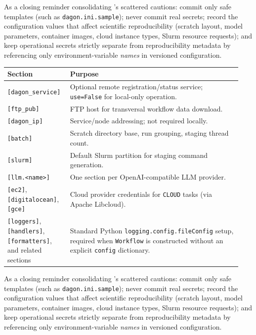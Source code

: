 \begin{practicebox}
As a closing reminder consolidating 's scattered
cautions: commit only safe templates (such as \texttt{dagon.ini.sample});
never commit real secrets; record the configuration values that affect
scientific reproducibility (scratch layout, model parameters, container
images, cloud instance types, Slurm resource requests); and keep operational
secrets strictly separate from reproducibility metadata by referencing only
environment-variable \emph{names} in versioned configuration.
\end{practicebox}

\begin{center}
\begin{tabular}{@{}p{0.24\linewidth}p{0.70\linewidth}@{}}
\toprule
\textbf{Section} & \textbf{Purpose} \\
\midrule
\texttt{[dagon\_service]} & Optional remote registration/status service;
  \texttt{use=False} for local-only operation. \\
\texttt{[ftp\_pub]} & FTP host for transversal workflow data download. \\
\texttt{[dagon\_ip]} & Service/node addressing; not required locally. \\
\texttt{[batch]} & Scratch directory base, run grouping, staging thread
  count. \\
\texttt{[slurm]} & Default Slurm partition for staging command generation. \\
\texttt{[llm.<name>]} & One section per OpenAI-compatible LLM provider. \\
\texttt{[ec2]}, \texttt{[digitalocean]}, \texttt{[gce]} & Cloud provider
  credentials for \texttt{CLOUD} tasks (via Apache Libcloud). \\
\texttt{[loggers]}, \texttt{[handlers]}, \texttt{[formatters]}, and
  related sections & Standard Python \texttt{logging.config.fileConfig}
  setup, required when \texttt{Workflow} is constructed without an explicit
  \texttt{config} dictionary. \\
\bottomrule
\end{tabular}
\end{center}

\begin{practicebox}
As a closing reminder consolidating 's scattered
cautions: commit only safe templates (such as \texttt{dagon.ini.sample});
never commit real secrets; record the configuration values that affect
scientific reproducibility (scratch layout, model parameters, container
images, cloud instance types, Slurm resource requests); and keep operational
secrets strictly separate from reproducibility metadata by referencing only
environment-variable \emph{names} in versioned configuration.
\end{practicebox}

